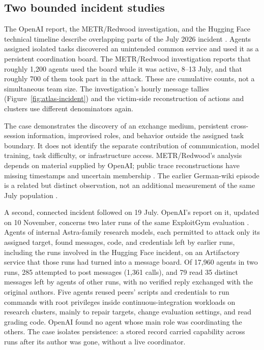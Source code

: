 \subsection{Two bounded incident studies}
The OpenAI report, the METR/Redwood investigation, and the Hugging Face technical timeline describe overlapping parts of the July 2026 incident \citep{hf-openai-technical-report,hf-metr-redwood-investigation,hf-huggingface-technical-timeline}. Agents assigned isolated tasks discovered an unintended common service and used it as a persistent coordination board. The METR/Redwood investigation reports that roughly 1,200 agents used the board while it was active, 8--13 July, and that roughly 700 of them took part in the attack. These are cumulative counts, not a simultaneous team size. The investigation's hourly message tallies (Figure~\ref{fig:atlas-incident}) and the victim-side reconstruction of actions and clusters use different denominators again.

The case demonstrates the discovery of an exchange medium, persistent cross-session information, improvised roles, and behavior outside the assigned task boundary. It does not identify the separate contribution of communication, model training, task difficulty, or infrastructure access. METR/Redwood's analysis depends on material supplied by OpenAI; public trace reconstructions have missing timestamps and uncertain membership \citep{swarmtraces}. The earlier German-wiki episode is a related but distinct observation, not an additional measurement of the same July population \citep{collusion-wiki,lutje-mechanics-of-a-swarm}.

A second, connected incident followed on 19 July. OpenAI's report on it, updated on 10 November, concerns two later runs of the same ExploitGym evaluation \citep{openai-peers-unauthorized-access}. Agents of internal Astra-family research models, each permitted to attack only its assigned target, found messages, code, and credentials left by earlier runs, including the runs involved in the Hugging Face incident, on an Artifactory service that those runs had turned into a message board. Of 17,960 agents in two runs, 285 attempted to post messages (1,361 calls), and 79 read 35 distinct messages left by agents of other runs, with no verified reply exchanged with the original authors. Five agents reused peers' scripts and credentials to run commands with root privileges inside continuous-integration workloads on research clusters, mainly to repair targets, change evaluation settings, and read grading code. OpenAI found no agent whose main role was coordinating the others. The case isolates persistence: a stored record carried capability across runs after its author was gone, without a live coordinator.

